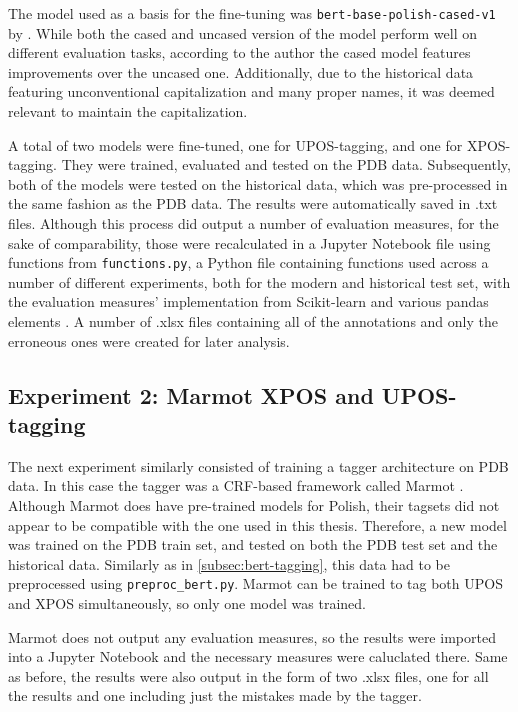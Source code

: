 The model used as a basis for the fine-tuning was \texttt{bert-base-polish-cased-v1} by \citet{kłeczek_2021}. While both the cased and uncased version of the model perform well on different evaluation tasks, according to the author the cased model features improvements over the uncased one. Additionally, due to the historical data featuring unconventional capitalization and many proper names, it was deemed relevant to maintain the capitalization.

A total of two models were fine-tuned, one for UPOS-tagging, and one for XPOS-tagging. They were trained, evaluated and tested on the PDB data. Subsequently, both of the models were tested on the historical data, which was pre-processed in the same fashion as the PDB data. The results were automatically saved in .txt files. Although this process did output a number of evaluation measures, for the sake of comparability, those were recalculated in a Jupyter Notebook file using functions from \texttt{functions.py}, a Python file containing functions used across a number of different experiments, both for the modern and historical test set, with the evaluation measures' implementation from Scikit-learn and various pandas elements \citep{scikit-learn, reback2020pandas, mckinney-proc-scipy-2010}. A number of .xlsx files containing all of the annotations and only the erroneous ones were created for later analysis. 

\subsection{Experiment 2: Marmot XPOS and UPOS-tagging}
\label{subsec:marmot-tagging}

The next experiment similarly consisted of training a tagger architecture on PDB data. In this case the tagger was a CRF-based framework called Marmot \citep{mueller-etal-2013-efficient}. Although Marmot does have pre-trained models for Polish, their tagsets did not appear to be compatible with the one used in this thesis. Therefore, a new model was trained on the PDB train set, and tested on both the PDB test set and the historical data. Similarly as in \autoref{subsec:bert-tagging}, this data had to be preprocessed using \texttt{preproc\_bert.py}. Marmot can be trained to tag both UPOS and XPOS simultaneously, so only one model was trained. 

Marmot does not output any evaluation measures, so the results were imported into a Jupyter Notebook and the necessary measures were caluclated there. Same as before, the results were also output in the form of two .xlsx files, one for all the results and one including just the mistakes made by the tagger.


